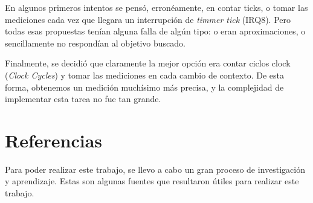 \documentclass[a4paper,10pt]{article}
\begin{document}
        En algunos primeros intentos se pensó, erronéamente, en contar ticks, o tomar las mediciones cada vez que llegara un interrupción de \textit{timmer tick} (IRQ8).
        Pero todas esas propuestas tenían alguna falla de algún tipo: o eran aproximaciones, o sencillamente no respondían al objetivo buscado.

        Finalmente, se decidió que claramente la mejor opción era contar ciclos clock (\textit{Clock Cycles}) y tomar las mediciones en cada cambio de contexto.
        De esta forma, obtenemos un medición muchísimo más precisa, y la complejidad de implementar esta tarea no fue tan grande.

\newpage     
\section{Referencias}

Para poder realizar este trabajo, se llevo a cabo un gran proceso de investigación y aprendizaje. Estas son algunas fuentes que resultaron útiles para realizar 
este trabajo.\\
\end{document}
